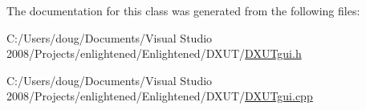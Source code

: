 The documentation for this class was generated from the following files:\begin{DoxyCompactItemize}
\item 
C:/Users/doug/Documents/Visual Studio 2008/Projects/enlightened/Enlightened/DXUT/\hyperlink{_d_x_u_tgui_8h}{DXUTgui.h}\item 
C:/Users/doug/Documents/Visual Studio 2008/Projects/enlightened/Enlightened/DXUT/\hyperlink{_d_x_u_tgui_8cpp}{DXUTgui.cpp}\end{DoxyCompactItemize}
